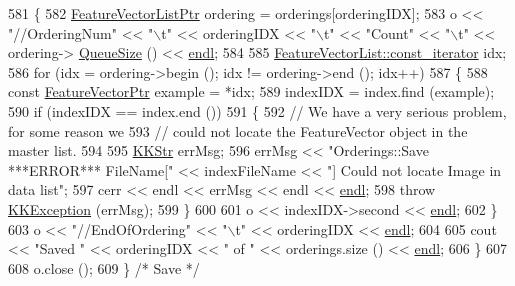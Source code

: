 \begin{DoxyCode}
581   \{
582     \hyperlink{class_k_k_m_l_l_1_1_feature_vector_list}{FeatureVectorListPtr}  ordering = orderings[orderingIDX];
583     o << \textcolor{stringliteral}{"//OrderingNum"} << \textcolor{stringliteral}{"\(\backslash\)t"} << orderingIDX << \textcolor{stringliteral}{"\(\backslash\)t"} << \textcolor{stringliteral}{"Count"} << \textcolor{stringliteral}{"\(\backslash\)t"} << ordering->
      \hyperlink{class_k_k_b_1_1_k_k_queue_a1dab601f75ee6a65d97f02bddf71c40d}{QueueSize} () << \hyperlink{namespace_k_k_b_ad1f50f65af6adc8fa9e6f62d007818a8}{endl};
584 
585     \hyperlink{class_k_k_b_1_1_k_k_queue_aeb057c9c010446f46f57c1e355f981f1}{FeatureVectorList::const\_iterator} idx;
586     \textcolor{keywordflow}{for}  (idx = ordering->begin ();  idx != ordering->end ();  idx++)
587     \{
588       \textcolor{keyword}{const} \hyperlink{class_k_k_m_l_l_1_1_feature_vector}{FeatureVectorPtr}  example = *idx;
589       indexIDX = index.find (example);
590       \textcolor{keywordflow}{if}  (indexIDX == index.end ())
591       \{
592         \textcolor{comment}{// We have a very serious problem,  for some reason we }
593         \textcolor{comment}{// could not locate the FeatureVector object in the master list.}
594 
595         \hyperlink{class_k_k_b_1_1_k_k_str}{KKStr} errMsg;
596         errMsg << \textcolor{stringliteral}{"Orderings::Save  ***ERROR***   FileName["} << indexFileName << \textcolor{stringliteral}{"]   Could not locate
       Image in data list"};
597         cerr << endl << errMsg << endl << \hyperlink{namespace_k_k_b_ad1f50f65af6adc8fa9e6f62d007818a8}{endl};
598         \textcolor{keywordflow}{throw} \hyperlink{class_k_k_b_1_1_k_k_exception}{KKException} (errMsg);
599       \}
600 
601       o << indexIDX->second << \hyperlink{namespace_k_k_b_ad1f50f65af6adc8fa9e6f62d007818a8}{endl};
602     \}
603     o << \textcolor{stringliteral}{"//EndOfOrdering"} << \textcolor{stringliteral}{"\(\backslash\)t"} << orderingIDX << \hyperlink{namespace_k_k_b_ad1f50f65af6adc8fa9e6f62d007818a8}{endl};
604 
605     cout << \textcolor{stringliteral}{"Saved "} << orderingIDX << \textcolor{stringliteral}{" of "} << orderings.size () << \hyperlink{namespace_k_k_b_ad1f50f65af6adc8fa9e6f62d007818a8}{endl};
606   \}
607 
608   o.close ();
609 \}  \textcolor{comment}{/* Save */}
\end{DoxyCode}
